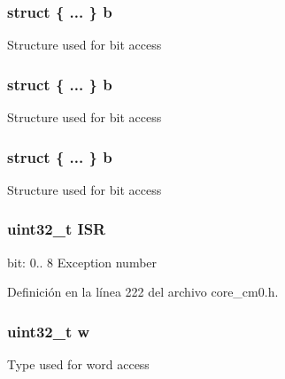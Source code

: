 \subsubsection[{\texorpdfstring{b}{b}}]{\setlength{\rightskip}{0pt plus 5cm}struct \{ ... \}   b}\hypertarget{union_i_p_s_r___type_ac4b1360265e95e8f834ee8f804b83f3a}{}\label{union_i_p_s_r___type_ac4b1360265e95e8f834ee8f804b83f3a}
Structure used for bit access 
\subsubsection[{\texorpdfstring{b}{b}}]{\setlength{\rightskip}{0pt plus 5cm}struct \{ ... \}   b}\hypertarget{union_i_p_s_r___type_a7f652697aca4eb51fd5a75cd894a13c7}{}\label{union_i_p_s_r___type_a7f652697aca4eb51fd5a75cd894a13c7}
Structure used for bit access 
\subsubsection[{\texorpdfstring{b}{b}}]{\setlength{\rightskip}{0pt plus 5cm}struct \{ ... \}   b}\hypertarget{union_i_p_s_r___type_a9da38bc566a366ab30cb221935ab2c46}{}\label{union_i_p_s_r___type_a9da38bc566a366ab30cb221935ab2c46}
Structure used for bit access 
\subsubsection[{\texorpdfstring{I\+SR}{ISR}}]{\setlength{\rightskip}{0pt plus 5cm}uint32\+\_\+t I\+SR}\hypertarget{union_i_p_s_r___type_ad502ba7dbb2aab5f87c782b28f02622d}{}\label{union_i_p_s_r___type_ad502ba7dbb2aab5f87c782b28f02622d}
bit\+: 0.. 8 Exception number 

Definición en la línea 222 del archivo core\+\_\+cm0.\+h.

\subsubsection[{\texorpdfstring{w}{w}}]{\setlength{\rightskip}{0pt plus 5cm}uint32\+\_\+t w}\hypertarget{union_i_p_s_r___type_ad0fb62e7a08e70fc5e0a76b67809f84b}{}\label{union_i_p_s_r___type_ad0fb62e7a08e70fc5e0a76b67809f84b}
Type used for word access 

